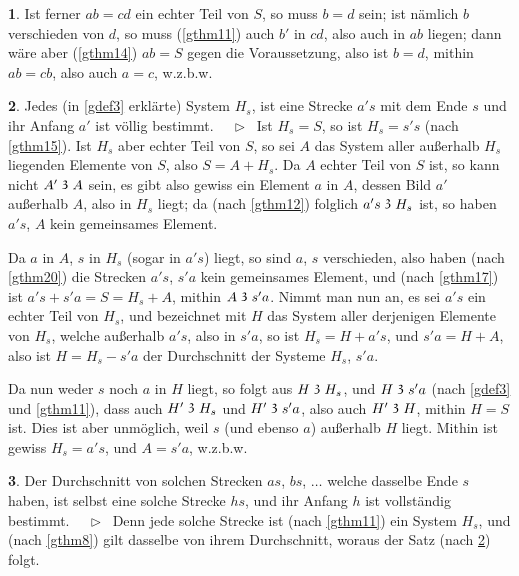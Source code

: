 \documentclass[leqno,hidelinks]{article}
\theoremstyle{definition}
\newtheorem{satz}{\protect\satzname}
\newcommand{\satzname}{}
\renewcommand{\satzname}{\hspace{-4pt}.\ Satz}%
\renewcommand{\satzname}{\hspace{-4pt}.\ Theorem}%
\newcommand\Beweis{\medskip \newline $ \phantom{'.'} \rhd \ $}%
\newcommand\TeilVon{\mathrel{\raisebox{0.45ex}{$\mathfrak{3}$}}}
\newcommand{\sref}[1]{\underline{\ref{#1}}}%
\begin{document}
\begin{paracol}{2}
\begin{satz}
Ist ferner $ab = cd$ ein echter Teil von $S$, so muss $b = d$ sein; ist nämlich
$b$ verschieden von $d$, so muss (\sref{gthm11}) auch $b'$ in $cd$, also auch in
$ab$ liegen; dann wäre aber (\sref{gthm14}) $ab = S$ gegen die Voraussetzung,
also ist $b = d$, mithin $ ab = cb$, also auch $a = c$, w.z.b.w.
\end{satz}

\begin{satz}\label{gthm27}
Jedes (in \sref{gdef3} erklärte) System $H_s$, ist eine Strecke $a's$ mit dem
Ende $s$ und ihr Anfang $a'$ ist völlig bestimmt.
\Beweis
Ist $H_s= S$, so ist $H_s= s's$ (nach \sref{gthm15}). Ist $H_s$ aber echter Teil
von $S$, so sei $A$ das System aller außerhalb $H_s$ liegenden Elemente von $S$,
also $S = A + H_s$. Da $A$ echter Teil von $S$ ist, so kann nicht $A' \TeilVon A$
sein, es gibt also gewiss ein Element $a$ in $A$, dessen Bild $a'$ außerhalb $A$,
also in $H_s$ liegt; da (nach \sref{gthm12}) folglich $a's \TeilVon H_s$ ist, so
haben $a's$, $A$ kein gemeinsames Element.

Da $a$ in  $A$, $s$ in $H_s$ (sogar in $a's$) liegt, so sind $a$, $s$ verschieden,
also haben (nach \sref{gthm20}) die Strecken $a's$, $s'a$ kein gemeinsames Element,
und (nach \sref{gthm17}) ist  $a's + s'a = S = H_s + A$, mithin $A \TeilVon s'a$.
Nimmt man nun an, es sei $a's$ ein echter Teil von $H_s$, und bezeichnet mit $H$
das System aller derjenigen Elemente von $H_s$, welche außerhalb $a's$, also in
$s'a$, so ist $H_s = H + a's$, und $s'a = H + A$, also ist $H = H_s - s'a$ der
Durchschnitt der Systeme $H_s$, $s'a$.

Da nun weder $s$ noch $a$ in $H$ liegt, so folgt aus $H \TeilVon H_s$, und
$H \TeilVon s'a$ (nach \sref{gdef3} und \sref{gthm11}), dass auch $H' \TeilVon H_s$
und $H' \TeilVon s'a$, also auch $H' \TeilVon H$, mithin $H = S$ ist. Dies ist
aber unmöglich, weil $s$ (und ebenso $a$) außerhalb $H$ liegt. Mithin ist gewiss
$H_s= a's$, und $A = s'a$, w.z.b.w.
\end{satz}

\newpage

\begin{satz}\label{gthm28}
Der Durchschnitt von solchen Strecken $as$, $bs$, $\ldots$ welche dasselbe Ende
$s$ haben, ist selbst eine solche Strecke $hs$, und ihr Anfang $h$ ist
vollständig bestimmt.
\Beweis
Denn jede solche Strecke ist (nach \sref{gthm11}) ein System $H_s$, und (nach \sref{gthm8})
gilt dasselbe von ihrem Durchschnitt, woraus der Satz (nach \sref{gthm27}) folgt.
\end{satz}


\end{paracol}
\end{document}
